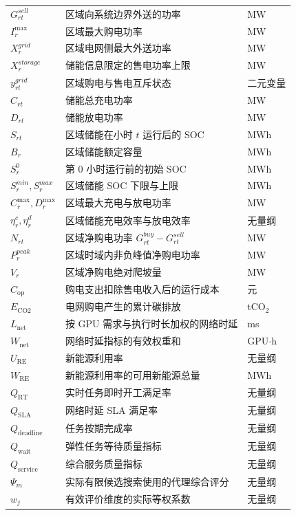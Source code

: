 \documentclass[withoutpreface,bwprint]{cumcmthesis}
\begin{document}
{\begin{longtable}{lll}
$G_{rt}^{sell}$ & 区域向系统边界外送的功率 & MW \\
$I_r^{\max}$ & 区域最大购电功率 & MW \\
$X_r^{grid}$ & 区域电网侧最大外送功率 & MW \\
$X_r^{storage}$ & 储能信息限定的售电功率上限 & MW \\
$y_{rt}^{grid}$ & 区域购电与售电互斥状态 & 二元变量 \\
$C_{rt}$ & 储能总充电功率 & MW \\
$D_{rt}$ & 储能放电功率 & MW \\
$S_{rt}$ & 区域储能在小时 $t$ 运行后的 SOC & MWh \\
$B_r$ & 区域储能额定容量 & MWh \\
$S_r^0$ & 第 $0$ 小时运行前的初始 SOC & MWh \\
$S_r^{min},S_r^{max}$ & 区域储能 SOC 下限与上限 & MWh \\
$C_r^{\max},D_r^{\max}$ & 区域最大充电与放电功率 & MW \\
$\eta_r^c,\eta_r^d$ & 区域储能充电效率与放电效率 & 无量纲 \\
$N_{rt}$ & 区域净购电功率 $G_{rt}^{buy}-G_{rt}^{sell}$ & MW \\
$P_r^{peak}$ & 区域时域内非负峰值净购电功率 & MW \\
$V_r$ & 区域净购电绝对爬坡量 & MW \\
$C_{\mathrm{op}}$ & 购电支出扣除售电收入后的运行成本 & 元 \\
$E_{\mathrm{CO2}}$ & 电网购电产生的累计碳排放 & tCO$_2$ \\
$L_{\mathrm{net}}$ & 按 GPU 需求与执行时长加权的网络时延 & ms \\
$W_{\mathrm{net}}$ & 网络时延指标的有效权重和 & GPU$\cdot$h \\
$U_{\mathrm{RE}}$ & 新能源利用率 & 无量纲 \\
$W_{\mathrm{RE}}$ & 新能源利用率的可用新能源总量 & MWh \\
$Q_{\mathrm{RT}}$ & 实时任务即时开工满足率 & 无量纲 \\
$Q_{\mathrm{SLA}}$ & 网络时延 SLA 满足率 & 无量纲 \\
$Q_{\mathrm{deadline}}$ & 任务按期完成率 & 无量纲 \\
$Q_{\mathrm{wait}}$ & 弹性任务等待质量指标 & 无量纲 \\
$Q_{\mathrm{service}}$ & 综合服务质量指标 & 无量纲 \\
$\Psi_m$ & 实际有限候选搜索使用的代理综合评分 & 无量纲 \\
$w_j$ & 有效评价维度的实际等权系数 & 无量纲 \\

\end{longtable}}
\end{document}
